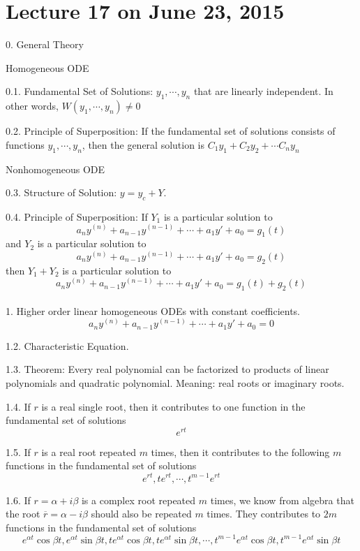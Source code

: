 \documentclass[11pt]{article}
\begin{document}
\section{Lecture 17 on June 23, 2015}


0. General Theory

Homogeneous ODE

0.1. Fundamental Set of Solutions: $y_1, \cdots, y_n$ that are linearly independent. In other words, $W(y_1, \cdots, y_n)\neq 0$

0.2. Principle of Superposition: If the fundamental set of solutions consists of functions $y_1, \cdots, y_n$, then the general solution is $C_1y_1 + C_2 y_2 + \cdots C_n y_n$

Nonhomogeneous ODE

0.3. Structure of Solution: $y= y_c + Y$. 

0.4. Principle of Superposition: If $Y_1$ is a particular solution to 
$$a_ny^{(n)} + a_{n-1}y^{(n-1)} + \cdots + a_1 y' + a_0 = g_1(t)$$
and $Y_2$ is a particular solution to
$$a_ny^{(n)} + a_{n-1}y^{(n-1)} + \cdots + a_1 y' + a_0 = g_2(t)$$
then $Y_1+Y_2$ is a particular solution to 
$$a_ny^{(n)} + a_{n-1}y^{(n-1)} + \cdots + a_1 y' + a_0 = g_1(t)+g_2(t)$$
\ \\


1. Higher order linear homogeneous ODEs with constant coefficients. 
$$a_ny^{(n)} + a_{n-1}y^{(n-1)} + \cdots + a_1 y' + a_0 = 0$$


1.2. Characteristic Equation. 

1.3. Theorem: Every real polynomial can be factorized to products of linear polynomials and quadratic polynomial. Meaning: real roots or imaginary roots. 

1.4. If $r$ is a real single root, then it contributes to one function in the fundamental set of solutions
$$e^{rt}$$

1.5. If $r$ is a real root repeated $m$ times, then it contributes to the following $m$ functions in the fundamental set of solutions
$$e^{rt}, te^{rt}, \cdots, t^{m-1}e^{rt}$$

1.6. If $r=\alpha + i\beta$ is a complex root repeated $m$ times, we know from algebra that the root $\overline{r} = \alpha-i\beta$ should also be repeated $m$ times. They contributes to $2m$ functions in the fundamental set of solutions
$$e^{\alpha t}\cos \beta t, e^{\alpha t}\sin \beta t, te^{\alpha t}\cos \beta t, te^{\alpha t}\sin \beta t, \cdots, t^{m-1}e^{\alpha t}\cos \beta t, t^{m-1}e^{\alpha t}\sin \beta t$$
\end{document}
